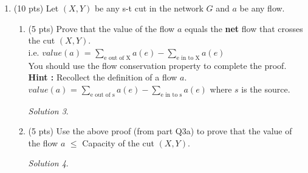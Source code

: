 \documentclass[12pt]{article}
\theoremstyle{remark}
\newtheorem*{solution}{Solution}
\begin{document}
\begin{enumerate}
\begin{enumerate}
\item (3 pts) Show the final flow f(e) for the edges of the original graph when the Ford-Fulkerson algorithm terminates.
\begin{solution}

\end{solution}

\item (4 pts) Find the minimum capacity cut with respect to the capacities on the original graph. Is this minimum capacity equal to the Max-Flow that you earlier identified? Justify your answer in a sentence. Also, report the crossing edges in this cut that are saturated (can't carry any more flow).
\begin{solution}

\end{solution}

\end{enumerate}
\pagebreak

\item (10 pts) Let $(X, Y)$ be any s-t cut in the network $G$ and $a$ be any flow. \begin{enumerate}
    \item (5 pts) Prove that the value of the flow $a$ equals the \textbf{net} flow that crosses the cut $(X, Y)$. \\
    i.e. $value(a)$ = $\sum\limits_{\text{e out of X}}^{}a(e) - \sum\limits_{\text{e in to X}}^{}a(e)$\\	You should use the flow conservation property to complete the proof. \\
    \textbf{Hint :} Recollect the definition of a flow $a$.\\
    $value(a)$ = $\sum\limits_{\text{e out of s}}^{}a(e) - \sum\limits_{\text{e in to s}}^{}a(e)$ where $s$ is the source.
    
    
\begin{solution}

\end{solution}

    \item (5 pts) Use the above proof (from part Q3a) to prove that the value of the flow $a$ $\leq$ Capacity of the cut $(X, Y)$.
\begin{solution}

\end{solution}
\end{enumerate}



\pagebreak


\end{enumerate}
\end{document}
